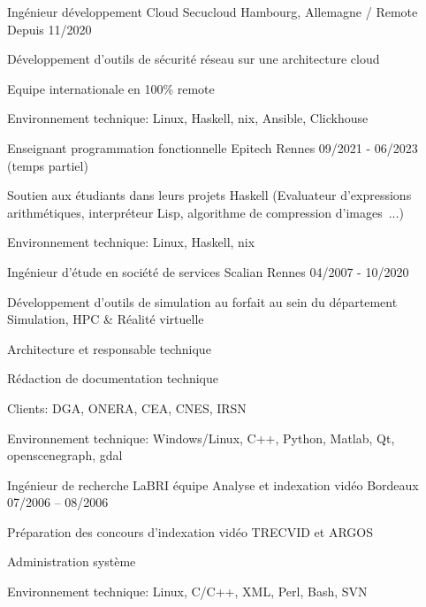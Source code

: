 \begin{cventries}
  \cventry
    {Ingénieur développement Cloud}
    {Secucloud}
    {Hambourg, Allemagne / Remote}
    {Depuis 11/2020}
    {
      \begin{cvitems}
        \item {Développement d'outils de sécurité réseau sur une architecture
            cloud}
        \item {Equipe internationale en 100\% remote}
        \item {Environnement technique: Linux, Haskell, nix, Ansible, Clickhouse}
      \end{cvitems}
    }

  \cventry
    {Enseignant programmation fonctionnelle}
    {Epitech}
    {Rennes}
    {09/2021 - 06/2023 (temps partiel)}
    {
      \begin{cvitems}
          \item {Soutien aux étudiants dans leurs projets Haskell (Evaluateur
              d'expressions arithmétiques, interpréteur Lisp, algorithme de
              compression d'images~...)}
          \item {Environnement technique: Linux, Haskell, nix}
      \end{cvitems}
    }

  \cventry
    {Ingénieur d'étude en société de services}
    {Scalian}
    {Rennes}
    {04/2007 - 10/2020}
    {
      \begin{cvitems}
        \item {Développement d'outils de simulation au forfait au sein du
            département Simulation, HPC \& Réalité virtuelle}
        \item {Architecture et responsable technique}
        \item {Rédaction de documentation technique}
        \item {Clients: DGA, ONERA, CEA, CNES, IRSN}
        \item {Environnement technique: Windows/Linux, C++, Python, Matlab, Qt,
            openscenegraph, gdal}
      \end{cvitems}
    }

  \cventry
    {Ingénieur de recherche}
    {LaBRI équipe Analyse et indexation vidéo}
    {Bordeaux}
    {07/2006 – 08/2006}
    {
      \begin{cvitems}
        \item {Préparation des concours d'indexation vidéo TRECVID et ARGOS}
        \item {Administration système}
        \item {Environnement technique: Linux, C/C++, XML, Perl, Bash, SVN}
      \end{cvitems}
    }


\end{cventries}
